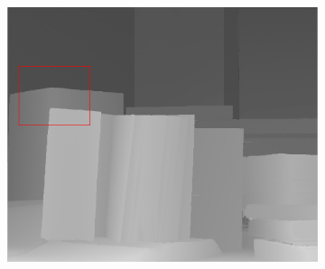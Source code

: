 \documentclass[preprint,10pt,5p,times,twocolumn]{elsarticle}
\begin{document}
\begin{figure}[t]
\begin{center}
\begin{subfigure}[b]{0.136\linewidth}
    \includegraphics[width=\linewidth]{cmp_book_8X_MST.png}
    \label{fig:} %
\end{subfigure}


\end{center}
\end{figure}
\end{document}

